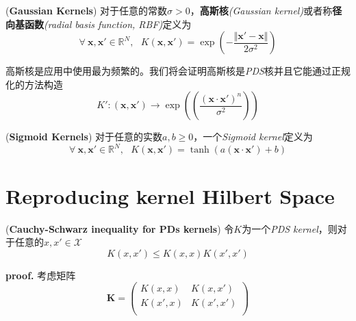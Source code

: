 \begin{example}
    (\textbf{Gaussian Kernels})\hspace*{0.5em} 对于任意的常数$\sigma>0$，\textbf{高斯核}\textsl{(Gaussian kernel)}或者称\textbf{径向基函数}\textsl{(radial basis function, RBF)}定义为
    \begin{equation}
        \forall\ \mathbf{x},\mathbf{x}'\in \mathbb{R}^N,\ \ \ K(\mathbf{x},\mathbf{x}')=\exp\left(-\frac{\Vert \mathbf{x}'-\mathbf{x}\Vert}{2\sigma^2}\right)
    \end{equation}

    高斯核是应用中使用最为频繁的。我们将会证明高斯核是\textsl{PDS}核并且它能通过正规化的方法构造
    \begin{equation}
        K':(\mathbf{x},\mathbf{x}')\rightarrow \exp((\frac{(\mathbf{x}\cdot \mathbf{x}')^n}{\sigma^2}))
    \end{equation}
\end{example}
\begin{example}
    (\textbf{Sigmoid Kernels})\hspace*{0.5em} 对于任意的实数$a,b\geqslant 0$，一个\textsl{Sigmoid kernel}定义为
    \begin{equation}
        \forall\ \mathbf{x},\mathbf{x}'\in \mathbb{R}^N,\ \ \ K(\mathbf{x},\mathbf{x}')=\tanh\left(a(\mathbf{x}\cdot \mathbf{x}')+b\right)
    \end{equation}
\end{example}

\section{Reproducing kernel Hilbert Space}

\begin{mdframed}
  \begin{lemma}
    (\textbf{Cauchy-Schwarz inequality for PDs kernels})\hspace{0.5em} 令$K$为一个\textsl{PDS kernel}，则对于任意的$x,x'\in \mathcal{X}$
    \begin{equation}
        K(x,x')\leqslant K(x,x)K(x',x')
    \end{equation}
  \end{lemma}  
\end{mdframed}

\textbf{proof.}\hspace*{0.5em} 考虑矩阵
\begin{equation}
    \mathbf{K}=\left(
        \begin{array}{cc}
            K(x,x) & K(x,x') \\
            K(x',x) & K(x',x') \\ 
        \end{array}
    \right)
\end{equation}

